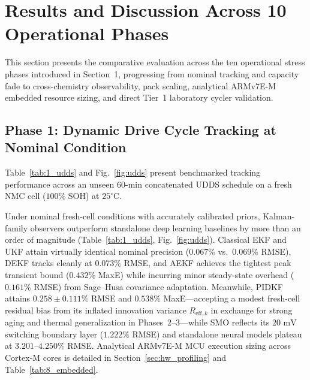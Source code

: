 \documentclass[11pt,a4paper]{article}
\begin{document}
\section{Results and Discussion Across 10 Operational Phases}
This section presents the comparative evaluation across the ten operational stress phases introduced in Section~1, progressing from nominal tracking and capacity fade to cross-chemistry observability, pack scaling, analytical ARMv7E-M embedded resource sizing, and direct Tier~1 laboratory cycler validation.

\subsection{Phase 1: Dynamic Drive Cycle Tracking at Nominal Condition}
Table~\ref{tab:1_udds} and Fig.~\ref{fig:udds} present benchmarked tracking performance across an unseen $60\text{-min}$ concatenated UDDS schedule on a fresh NMC cell ($100\%$ SOH) at $25^\circ\text{C}$.

Under nominal fresh-cell conditions with accurately calibrated priors, Kalman-family observers outperform standalone deep learning baselines by more than an order of magnitude (Table~\ref{tab:1_udds}, Fig.~\ref{fig:udds}). Classical EKF and UKF attain virtually identical nominal precision ($0.067\%$ vs.\ $0.069\%$ RMSE), DEKF tracks cleanly at $0.073\%$ RMSE, and AEKF achieves the tightest peak transient bound ($0.432\%$ MaxE) while incurring minor steady-state overhead ($0.161\%$ RMSE) from Sage--Husa covariance adaptation. Meanwhile, PIDKF attains $0.258\pm0.111\%$ RMSE and $0.538\%$ MaxE---accepting a modest fresh-cell residual bias from its inflated innovation variance $R_{\text{eff},k}$ in exchange for strong aging and thermal generalization in Phases~2--3---while SMO reflects its $20\text{ mV}$ switching boundary layer ($1.222\%$ RMSE) and standalone neural models plateau at $3.201\text{--}4.250\%$ RMSE. Analytical ARMv7E-M MCU execution sizing across Cortex-M cores is detailed in Section~\ref{sec:hw_profiling} and Table~\ref{tab:8_embedded}.
\end{document}
